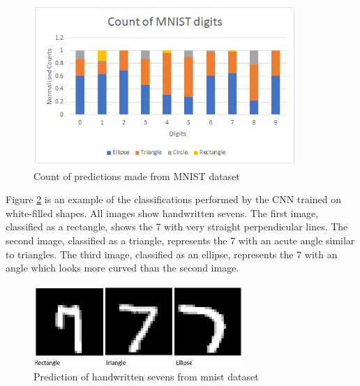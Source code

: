 \begin{figure}
	\begin{center}
		\includegraphics[width=100mm, scale=1]{graph_mnist.png}
		\caption{Count of predictions made from MNIST dataset}
		\label{fig:graph_mnist}
	\end{center}
	
\end{figure}
Figure \ref{fig:mnistseven} is an example of the classifications performed by the CNN trained on white-filled shapes. All images show handwritten sevens. The first image, classified as a rectangle, shows the 7 with very straight perpendicular lines. The second image, classified as a triangle, represents the 7 with an acute angle similar to triangles. The third image, classified as an ellipse, represents the 7 with an angle which looks more curved than the second image. 
\begin{figure}[H]
	\begin{center}
		\includegraphics[width=80mm, scale=1]{mnistseven.png}
		\caption{Prediction of handwritten sevens from mnist dataset}
		\label{fig:mnistseven}
	\end{center}
	
\end{figure}

